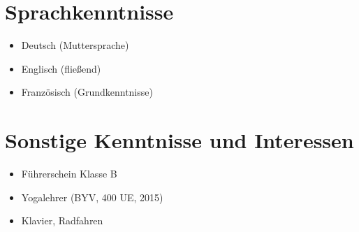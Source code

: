 \documentclass[11pt,a4paper,sans]{moderncv}
\begin{document}
\section{Sprachkenntnisse}
\begin{itemize}
	\setlength{\itemindent}{6.35em}
	\item Deutsch (Muttersprache)
	\item Englisch (fließend)
	\item Französisch (Grundkenntnisse)
\end{itemize}

\section{Sonstige Kenntnisse und Interessen}
\begin{itemize}
	\setlength{\itemindent}{6.35em}
	\item Führerschein Klasse B
	\item Yogalehrer (BYV, 400 UE, 2015)
	\item Klavier, Radfahren
\end{itemize}
\end{document}
